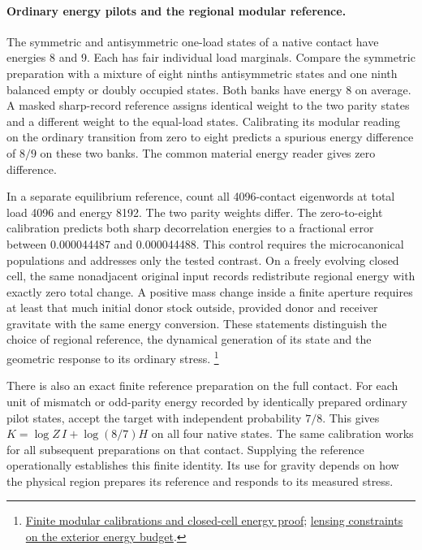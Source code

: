 \documentclass[11pt]{article}
\begin{document}
\paragraph{Ordinary energy pilots and the regional modular reference.}
The symmetric and antisymmetric one-load states of a native contact
have energies 8 and 9. Each has fair individual load marginals.
Compare the symmetric preparation with a mixture of eight ninths
antisymmetric states and one ninth balanced empty or doubly occupied
states. Both banks have energy 8 on average. A masked sharp-record
reference assigns identical weight to the two parity states and a
different weight to the equal-load states. Calibrating its modular
reading on the ordinary transition from zero to eight predicts a
spurious energy difference of $8/9$ on these two banks. The common
material energy reader gives zero difference.

In a separate equilibrium reference, count all 4096-contact
eigenwords at total load 4096 and energy 8192. The two parity
weights differ. The zero-to-eight calibration predicts both sharp
decorrelation energies to a fractional error between 0.000044487 and
0.000044488. This control requires the microcanonical populations and
addresses only the tested contrast. On a freely evolving closed
cell, the same nonadjacent original input records redistribute
regional energy with exactly zero total change. A positive mass
change inside a finite aperture requires at least that much initial
donor stock outside, provided donor and receiver gravitate with the
same energy conversion. These statements distinguish the choice of
regional reference, the dynamical generation of its state and the
geometric response to its ordinary stress.%
\footnote{\href{https://github.com/FloatingPragma/observer-patch-holography/tree/main/model/experiments/interval_echo_shell_flux/product_address/green_response/material_recoil/overlap_source/closed_region}{Finite modular calibrations and closed-cell energy proof};
\href{https://github.com/FloatingPragma/observer-patch-holography/tree/main/code/cosmology/rar_deep_regime/compensation}{lensing constraints on the exterior energy budget}.}

There is also an exact finite reference preparation on the full
contact. For each unit of mismatch or odd-parity energy recorded by
identically prepared ordinary pilot states, accept the target with
independent probability $7/8$. This gives
$K=\log Z\,I+\log(8/7)H$ on all four native states. The same
calibration works for all subsequent preparations on that contact.
Supplying the reference operationally establishes this finite
identity. Its use for gravity depends on how the physical region
prepares its reference and responds to its measured stress.
\end{document}
